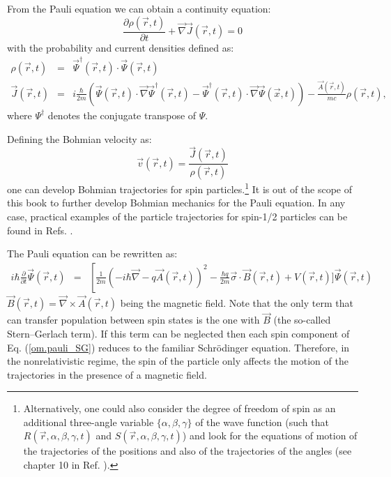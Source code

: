 \documentclass[onecolumn,nofootinbib, secnumarabic, amsmath, nobibnotes,12pt,aps,pra]{revtex4-1}
\newcommand{\eref}[1]{Eq. (\ref{#1})}
\begin{document}
From the Pauli equation we can obtain a continuity equation:
\begin{equation}
\label{om.difcurrent_density_pauli}
\frac{\partial\rho(\vec{r},t)}{\partial t} + \vec{\nabla} \vec{J}(\vec{r},t) = 0
\end{equation}
with the probability and current densities defined as:
\begin{eqnarray}
\label{om.rhospin}
\rho(\vec r,t) & = & \vec \Psi^{\dagger}(\vec{r},t)\cdot\vec \Psi(\vec{r},t) \\
\label{om.currentspin}
\vec J(\vec{r},t) & = & i \frac {\hbar} {2 m}
\left(\vec\Psi(\vec{r},t)\cdot {\vec{\nabla} \vec
\Psi^{\dagger}(\vec{r},t)} - \vec\Psi^{\dagger}(\vec{r},t) \cdot
{\vec{\nabla} \vec \Psi(\vec{x},t)} \right)-\frac {\vec A(\vec r,t)} {mc} \rho(\vec r,t),
\end{eqnarray}
where $\Psi^{\dagger}$ denotes the conjugate transpose of $\Psi$.

Defining the Bohmian velocity as:
\begin{equation}
\vec v(\vec r,t) = \frac{ \vec{J}(\vec{r},t)}{\rho(\vec r,t)}
\end{equation}
one can develop Bohmian trajectories for spin particles.\footnote{Alternatively, one could also consider the degree of freedom of spin as an additional three-angle variable $\{\alpha,\beta,\gamma\}$ of the wave function (such that $R(\vec r,\alpha,\beta,\gamma,t)$ and $S(\vec r,\alpha,\beta,\gamma,t)$) and look for the equations of motion of the trajectories of the positions and also of the trajectories of the angles (see chapter 10 in Ref. \cite{om.Holand1993}).} It is out of the scope of this book to further develop Bohmian mechanics for the Pauli equation.
In any case, practical examples of the particle trajectories for spin-1/2 particles can be found in Refs. \cite{om.Holland2003,om.colijn2002}.

The Pauli equation can be rewritten as:
\begin{eqnarray}
\label{om.pauli_SG}
i \hbar \frac{ \partial}{\partial t} \vec \Psi(\vec r,t) &=&
\left[ \frac{1}{2m} \left(- i \hbar \vec{\nabla} - q \vec{A}(\vec r,t)\right) ^2 -\frac{\hbar q}{2m} \vec{\sigma}\cdot\vec{B}(\vec r,t)\right.+ V(\vec r,t) \bigg]\vec \Psi(\vec r,t)
\end{eqnarray}
$\vec{B}(\vec r,t) = \vec{\nabla} \times \vec{A}(\vec r,t)$ being
the magnetic field. Note that the only term that can transfer
population between spin states is the one with $\vec{B}$ (the
so-called Stern--Gerlach term). If this term can be neglected then
each spin component of \eref{om.pauli_SG} reduces to the familiar
Schr\"odinger equation. Therefore, in the nonrelativistic regime,
the spin of the particle only affects the motion of the trajectories
in the presence of a magnetic field.
\end{document}
